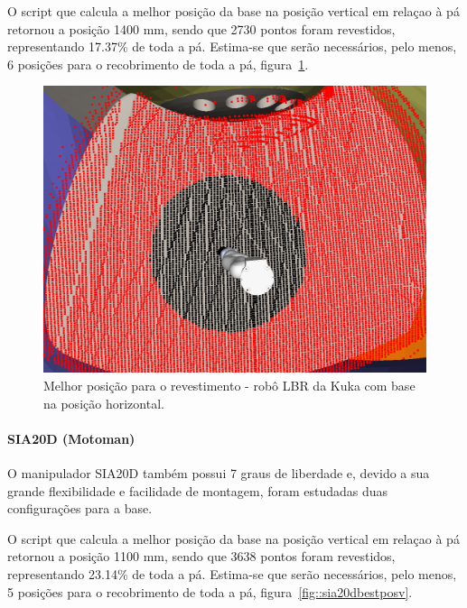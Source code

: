 O script que calcula a melhor posição da base na posição vertical em relaçao à
pá retornou a posição 1400 mm, sendo que 2730 pontos foram revestidos,
representando 17.37\% de toda a pá. Estima-se que serão necessários, pelo menos,
6 posições para o recobrimento de toda a pá, figura~\ref{fig::lbrbestposh}.

\begin{figure}[h!]	
	\includegraphics[width=\columnwidth]{figs/bighatch/lbr_bestposh.png}
	\caption{Melhor posição para o revestimento - robô LBR da Kuka com base na
	posição horizontal.}
	\label{fig::lbrbestposh}
\end{figure}

\paragraph{SIA20D (Motoman)}
O manipulador SIA20D também possui 7 graus de liberdade e, devido a sua
grande flexibilidade e facilidade de montagem, foram estudadas duas
configurações para a base.

O script que calcula a melhor posição da base na posição vertical em relaçao à
pá retornou a posição 1100 mm, sendo que 3638 pontos foram revestidos,
representando 23.14\% de toda a pá. Estima-se que serão necessários, pelo menos,
5 posições para o recobrimento de toda a pá, figura~\ref{fig::sia20dbestposv}.

